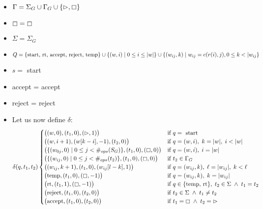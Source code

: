 \documentclass[11pt]{article}
\begin{document}
\begin{itemize}
	\item $\Gamma=\Sigma_G\cup\Gamma_G\cup\{\rhd,\boxempty\}$
	\item $\boxempty=\boxempty$
	\item $\Sigma=\Sigma_G$
	\item $Q=\{\text{start, rt, accept, reject, temp}\}\cup\{(w,i)\hspace{1mm}|\hspace{1mm}0\leq i\leq|w|\}\cup\{(w_{ij},k)\hspace{1mm}|\hspace{1mm}w_{ij}=c(r(i),j),0\leq k<|w_{ij}\}$
	\item $s=$ start
	\item accept = accept
	\item reject = reject
	\item Let us now define $\delta$:
	\[\delta(q,t_1,t_2)\begin{cases}
		\big((w,0),(t_1,0),(\rhd,1)\big) & \text{if }q=\text{ start} \\
		\big((w,i+1),(w[k-i],-1),(t_2,0)\big) & \text{if }q=(w,i),\hspace{1mm}k=|w|,\hspace{1mm}i<|w| \\
		\big(\{(w_{0j},0)\hspace{1mm}|\hspace{1mm}0\leq j<\#_{ops}(S_G)\},(t_1,0),(\boxempty,0)\big) & \text{if }q=(w,i),\hspace{1mm}i=|w| \\
		\big(\{(w_{ij},0)\hspace{1mm}|\hspace{1mm}0\leq j<\#_{ops}(t_2)\},(t_1,0),(\boxempty, 0)\big) & \text{if }t_2\in\Gamma_G \\
		\big((w_{ij},k+1),(t_1,0),(w_{ij}[l-k],1)\big) & \text{if }q=(w_{ij},k),\hspace{1mm}\ell=|w_{ij}|,\hspace{1mm}k<\ell \\
		\big(\text{temp},(t_1,0),(\boxempty,-1)\big) & \text{if }q=(w_{ij},k),\hspace{1mm}k=|w_{ij}| \\
		\big(\text{rt},(t_1,1),(\boxempty,-1)\big) & \text{if }q\in\{\text{temp, rt}\},\hspace{1mm}t_2\in\Sigma\hspace{1mm}\wedge\hspace{1mm}t_1=t_2 \\
		\big(\text{reject},(t_1,0),(t_2,0)\big) & \text{if }t_2\in\Sigma\hspace{1mm}\wedge\hspace{1mm}t_1\neq t_2 \\
		\big(\text{accept},(t_1,0),(t_2,0)\big) & \text{if }t_1=\boxempty\hspace{1mm}\wedge\hspace{1mm}t_2=\rhd
	\end{cases}\]
\end{itemize}
\end{document}
